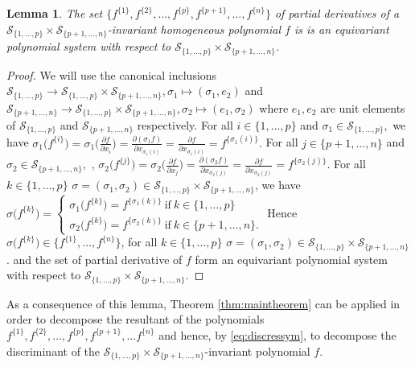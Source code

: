 \documentclass[10pt,a4paper]{amsart}
\newtheorem{lemma}{Lemma}
\begin{document}
\begin{lemma}
The set $\{ f^{\{1\}},f^{\{2\}},\ldots,f^{\{p\}},f^{\{p+1\}},\ldots,f^{\{n\}} \}$ of partial derivatives of a  $\mathcal{S}_{\{1,\ldots,p\}}\times\mathcal{S}_{\{p+1,\ldots,n\}} $-invariant homogeneous polynomial $f$ is is an equivariant polynomial system with respect to $\mathcal{S}_{\{1,\ldots,p\}}\times\mathcal{S}_{\{p+1,\ldots,n\}} $.
\end{lemma}
\begin{proof}
We will use the canonical inclusions  $ \mathcal{S}_{\{1,\ldots,p\}} \to \mathcal{S}_{\{1,\ldots,p\}}\times\mathcal{S}_{\{p+1,\ldots,n\}}, \sigma_1 \mapsto (\sigma_1, e_2)$ and  $ \mathcal{S}_{\{p+1,\ldots,n\}} \to \mathcal{S}_{\{1,\ldots,p\}}\times\mathcal{S}_{\{p+1,\ldots,n\}}, \sigma_2 \mapsto (e_1,\sigma_2)$ where $e_1, e_2$ are unit elements of $ \mathcal{S}_{\{1,\ldots,p\}}$ and $\mathcal{S}_{\{p+1,\ldots,n\}}$ respectively.
For all $i\in \{1,\ldots,p\}$ and $\sigma_1 \in \mathcal{S}_{\{1,\ldots,p\}},$ we have $\sigma_1\Big(f^{\{i\}}\Big)=\sigma_1\Big(\frac{\partial f}{\partial x_{i}}\Big)=\frac{\partial (\sigma_1f)}{\partial x_{\sigma_1(i)}}=\frac{\partial f}{\partial x_{\sigma_1(i)}} =f^{\{ {\sigma_1(i)} \}}.$ For all $j\in \{p+1,\ldots,n\}$ and $\sigma_2 \in \mathcal{S}_{\{p+1,\ldots,n\}},$ , $\sigma_2\Big(f^{\{j\}}\Big)=\sigma_2\Big(\frac{\partial f}{\partial x_{j}}\Big)=\frac{\partial (\sigma_2 f)}{\partial x_{\sigma_2(j)}}=\frac{\partial f}{\partial x_{\sigma_2(j)}} =f^{\{ {\sigma_2(j)} \}}.$ For all $k \in \{1,\ldots,p\}$ $\sigma= (\sigma_1, \sigma_2) \in \mathcal{S}_{\{1,\ldots,p\}}\times\mathcal{S}_{\{p+1,\ldots,n\}}$, we have $\sigma \Big( f^{\{k\}} \Big)= \begin{cases}
\sigma_1 \Big( f^{\{k\}} \Big)= f^{\{ {\sigma_1(k)} \}}\  \mbox{if}\  k\in \{1,\ldots,p\} \\
\sigma_2 \Big( f^{\{k\}} \Big)= f^{\{ {\sigma_2(k)} \}}\  \mbox{if}\  k\in \{p+1,\ldots,n\}.
\end{cases}$
Hence $\sigma \Big( f^{\{k\}} \Big) \in  \{ f^{\{1\}},\ldots ,f^{\{n\}} \}$, for all  $k \in \{1,\ldots,p\}$ $\sigma= (\sigma_1, \sigma_2) \in \mathcal{S}_{\{1,\ldots,p\}}\times\mathcal{S}_{\{p+1,\ldots,n\}}$. and the set of partial derivative of $f$ form  an equivariant polynomial system with respect to $\mathcal{S}_{\{1,\ldots,p\}}\times\mathcal{S}_{\{p+1,\ldots,n\}} $.
\end{proof}


As a consequence of this lemma, Theorem \ref{thm:maintheorem} can be applied in order to decompose the resultant of the polynomials $f^{\{1\}},f^{\{2\}},\ldots,f^{\{p\}},f^{\{p+1\}},\ldots f^{\{n\}}$ and hence, by \eqref{eq:discressym}, to decompose the discriminant of the $\mathcal{S}_{\{1,\ldots,p\}}\times\mathcal{S}_{\{p+1,\ldots,n\}} $-invariant polynomial $f$. %
\end{document}
